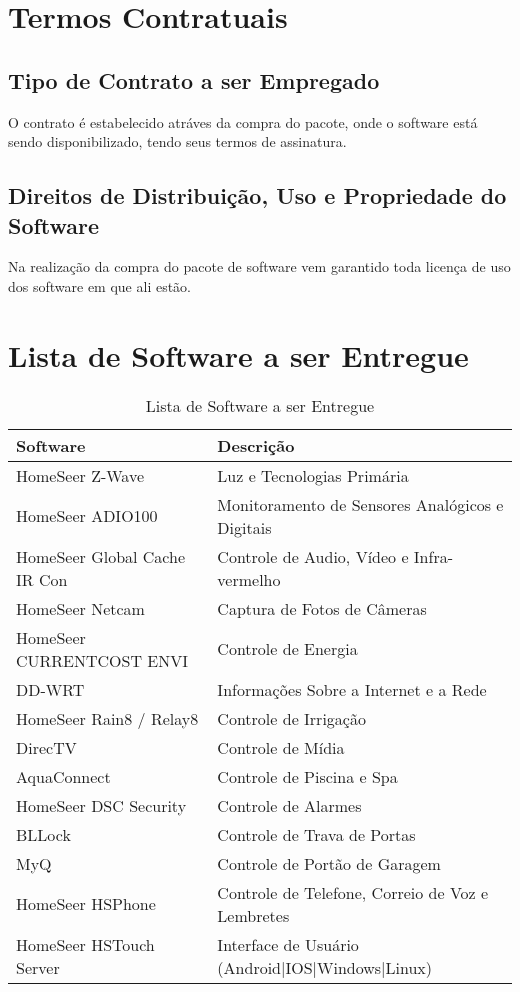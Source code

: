 \section{Termos Contratuais}

\subsection{Tipo de Contrato a ser Empregado}
	O contrato é estabelecido atráves da compra do pacote, onde o software está sendo disponibilizado,
	tendo seus termos de assinatura.

\subsection{Direitos de Distribuição, Uso e Propriedade do Software}
	Na realização da compra do pacote de software vem garantido toda licença de uso dos software em que ali estão.

\section{Lista de Software a ser Entregue}

\begin{table}[H]
\begin{tabular}{|l|l|}
	\hline
	\textbf{Software} & \textbf{Descrição}\tabularnewline
	\hline
	\hline
	HomeSeer Z-Wave & Luz e Tecnologias Primária\tabularnewline
	\hline
	HomeSeer ADIO100 & Monitoramento de Sensores Analógicos e Digitais\tabularnewline
	\hline
	HomeSeer Global Cache IR Con & Controle de Audio, Vídeo e Infra-vermelho\tabularnewline
	\hline
	HomeSeer Netcam & Captura de Fotos de Câmeras\tabularnewline
	\hline
	HomeSeer CURRENTCOST ENVI & Controle de Energia\tabularnewline
	\hline
	DD-WRT & Informações Sobre a Internet e a Rede\tabularnewline
	\hline
	HomeSeer Rain8 / Relay8 & Controle de Irrigação\tabularnewline
	\hline
	DirecTV & Controle de Mídia\tabularnewline
	\hline
	AquaConnect & Controle de Piscina e Spa\tabularnewline
	\hline
	HomeSeer DSC Security & Controle de Alarmes\tabularnewline
	\hline
	BLLock & Controle de Trava de Portas\tabularnewline
	\hline
	MyQ & Controle de Portão de Garagem\tabularnewline
	\hline
	HomeSeer HSPhone & Controle de Telefone, Correio de Voz e Lembretes\tabularnewline
	\hline
	HomeSeer HSTouch Server & Interface de Usuário (Android|IOS|Windows|Linux)\tabularnewline
	\hline
\end{tabular}
\caption{Lista de Software a ser Entregue}
\label{Lista_de_Software_a_ser_Entregue}
\end{table}


